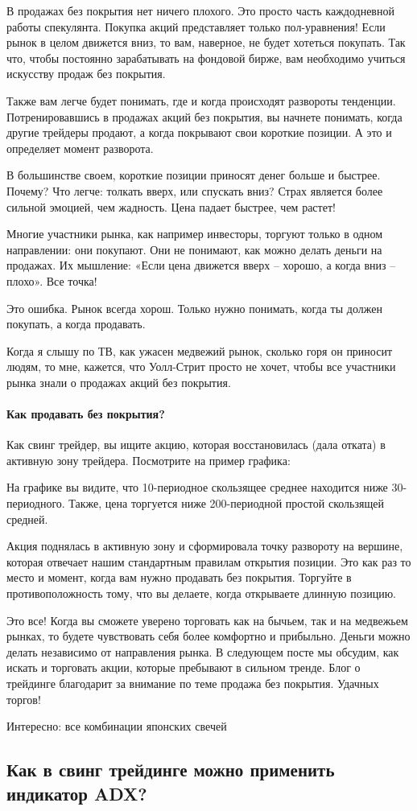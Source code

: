 \documentclass{book}
\begin{document}
В продажах без покрытия нет ничего плохого. Это просто часть каждодневной работы спекулянта. Покупка акций представляет только пол-уравнения! Если рынок в целом движется вниз, то вам, наверное, не будет хотеться покупать. Так что, чтобы постоянно зарабатывать на фондовой бирже, вам необходимо учиться искусству продаж без покрытия.

Также вам легче будет понимать, где и когда происходят развороты тенденции. Потренировавшись в продажах акций без покрытия, вы начнете понимать, когда другие трейдеры продают, а когда покрывают свои короткие позиции. А это и определяет момент разворота.

В большинстве своем, короткие позиции приносят денег больше и быстрее. Почему? Что легче: толкать вверх, или спускать вниз? Страх является более сильной эмоцией, чем жадность. Цена падает быстрее, чем растет!

Многие участники рынка, как например инвесторы, торгуют только в одном направлении: они покупают. Они не понимают, как можно делать деньги на продажах. Их мышление: «Если цена движется вверх – хорошо, а когда вниз – плохо». Все точка!

Это ошибка. Рынок всегда хорош. Только нужно понимать, когда ты должен покупать, а когда продавать.

Когда я слышу по ТВ, как ужасен медвежий рынок, сколько горя он
приносит людям, то мне, кажется, что Уолл-Стрит просто не хочет, чтобы
все участники рынка знали о продажах акций без покрытия.

\paragraph{Как продавать без покрытия?}

Как свинг трейдер, вы ищите акцию, которая восстановилась (дала отката) в активную зону трейдера. Посмотрите на пример графика:

На графике вы видите, что 10-периодное скользящее среднее находится ниже 30-периодного. Также, цена торгуется ниже 200-периодной простой скользящей средней.

Акция поднялась в активную зону и сформировала точку развороту на вершине, которая отвечает нашим стандартным правилам открытия позиции. Это как раз то место и момент, когда вам нужно продавать без покрытия. Торгуйте в противоположность тому, что вы делаете, когда открываете длинную позицию.

Это все! Когда вы сможете уверено торговать как на бычьем, так и на медвежьем рынках, то будете чувствовать себя более комфортно и прибыльно. Деньги можно делать независимо от направления рынка. В следующем посте мы обсудим, как искать и торговать акции, которые пребывают в сильном тренде. Блог о трейдинге благодарит за внимание по теме продажа без покрытия. Удачных торгов!


Интересно: все комбинации японских свечей

\subsection{Как в свинг трейдинге можно применить индикатор ADX?}
\end{document}
